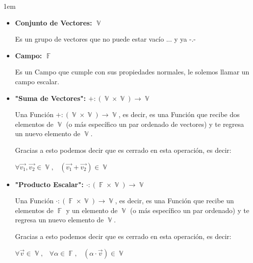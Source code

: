 \documentclass[12pt, fleqn]{report}                             %
\newenvironment{SmallIndentation}[1][0.75em]                    %
        {\begin{adjustwidth}{#1}{}\begin{footnotesize}}             %
        {\end{footnotesize}\end{adjustwidth}}                       %
\DeclareMathOperator \Space {\quad}                             %
\DeclareMathOperator \MiniSpace {\;}                            %
\theoremstyle{break}                                            %
\DeclareMathOperator \GenericField {\mathbb{F}}                 %
\DeclareMathOperator \VectorSet    {\mathbb{V}}                 %
\begin{document}
            \begin{SmallIndentation}[1em]
                
                \begin{itemize}
                
                    \item
                        \textbf{Conjunto de Vectores: $\VectorSet$}

                        Es un grupo de vectores que no puede estar vacío ... y ya -.- 

                    \item
                        \textbf{Campo: $\GenericField$}

                        Es un Campo que cumple con sus propiedades normales, le solemos llamar un campo escalar.

                    \item
                        \textbf{"Suma de Vectores": $+: (\VectorSet \times  \VectorSet) \to \VectorSet$}

                        Una Función $+: (\VectorSet \times  \VectorSet) \to \VectorSet$, es decir, es una Función
                        que recibe dos elementos de $\VectorSet$ (o más específico un par ordenado de vectores) y te
                        regresa un nuevo elemento de $\VectorSet$.

                        Gracias a esto podemos decir que es cerrado en esta operación, es decir:

                        $\forall \vec{v_1}, \vec{v_2} \in \VectorSet,
                            \MiniSpace (\vec{v_1} + \vec{v_2}) \in \VectorSet$  


                    \item
                        \textbf{"Producto Escalar": $\cdot: (\GenericField \times  \VectorSet) \to \VectorSet$}

                        Una Función $\cdot: (\GenericField \times  \VectorSet) \to \VectorSet$, es decir, es una Función
                        que recibe un elementos de $\GenericField$ y un elemento de $\VectorSet$
                        (o más específico un par ordenado) y te regresa un nuevo elemento de $\VectorSet$.

                        Gracias a esto podemos decir que es cerrado en esta operación, es decir:

                        $\forall \vec{v} \in \VectorSet, \MiniSpace
                            \forall \alpha \in \GenericField, \MiniSpace
                                (\alpha \cdot \vec{v}) \in \VectorSet$  
                \end{itemize}
            
            \end{SmallIndentation}
\end{document}
